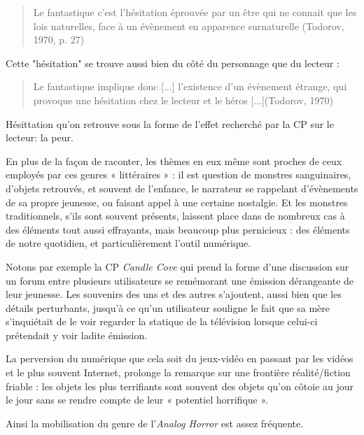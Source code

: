 \documentclass[12pt,a4paper,oneside,titlepage]{article} %
\begin{document}
	\begin{quotation}
Le fantastique c’est l’hésitation éprouvée par un être qui ne connait que les lois naturelles, face à un évènement en apparence surnaturelle (Todorov, 1970, p. 27)\newline
	\end{quotation}

Cette "hésitation" se trouve aussi bien du côté du personnage que du lecteur : 
\begin{quotation}
	Le fantastique implique donc [...] l’existence d’un évènement étrange, qui provoque une hésitation chez le lecteur et le héros [...](Todorov, 1970)
\end{quotation}

Hésittation qu'on retrouve sous la forme de l'effet recherché par la CP sur le lecteur: la peur.

\par
En plus de la façon de raconter, les thèmes en eux même sont proches de ceux employés par ces genres « littéraires » : il est question de monstres sanguinaires, d’objets retrouvés, et souvent de l’enfance, le narrateur se rappelant d’évènements de sa propre jeunesse, ou faisant appel à une certaine nostalgie. Et les monstres traditionnels, s’ils sont souvent présents, laissent place dans de nombreux cas à des éléments tout aussi effrayants, mais beaucoup plus pernicieux : des éléments de notre quotidien, et particulièrement l’outil numérique. 
\par
Notons par exemple la CP \emph{Candle Cove} qui prend la forme d’une discussion sur un forum entre plusieurs utilisateurs se remémorant une émission dérangeante de leur jeunesse. Les souvenirs des uns et des autres s’ajoutent, aussi bien que les détails perturbants, jusqu’à ce qu’un utilisateur souligne le fait que sa mère s’inquiétait de le voir regarder la statique de la télévision lorsque celui-ci prétendait y voir ladite émission. 
\par
La perversion du numérique que cela soit du jeux-vidéo en passant par les vidéos et le plus souvent Internet, prolonge la remarque sur une frontière réalité/fiction friable : les objets les plus terrifiants sont souvent des objets qu’on côtoie au jour le jour sans se rendre compte de leur « potentiel horrifique ».
\par
Ainsi la mobilisation du genre de l’\emph{Analog Horror }est assez fréquente. 
\end{document}
